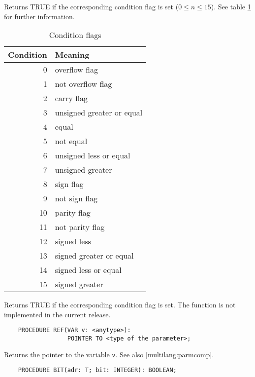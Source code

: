 \ifcomment
Returns TRUE if the corresponding condition flag is set ($0\leq n\leq 15$).
See table \ref{table:cc} for further information.
\begin{center}
\begin{table}
\begin{flushleft}
\begin{tabular}{|r|l|}\hline
\bf Condition    &\bf Meaning \\ \hline
 0 &   overflow flag                    \\
 1 &   not overflow flag                \\
 2 &   carry flag                       \\
 3 &   unsigned greater or equal        \\
 4 &   equal                            \\
 5 &   not equal                        \\
 6 &   unsigned less or equal           \\
 7 &   unsigned greater                 \\
 8 &   sign flag                        \\
 9 &   not sign flag                    \\
10 &   parity flag                      \\
11 &   not parity flag                  \\
12 &   signed less                      \\
13 &   signed greater or equal          \\
14 &   signed less or equal             \\
15 &   signed greater                   \\
\hline
\end{tabular}
\end{flushleft}
\caption{Condition flags}\label{table:cc}
\end{table}
\end{center}
\else
Returns TRUE if the corresponding condition flag is set.
The function is not implemented in the current release.
\fi

\verb'    PROCEDURE REF(VAR v: <anytype>):'\\
\verb'                  POINTER TO <type of the parameter>;'


Returns the pointer to the variable {\tt v}. See also
\ref{multilang:parmcomp}.

\verb'    PROCEDURE BIT(adr: T; bit: INTEGER): BOOLEAN;'

